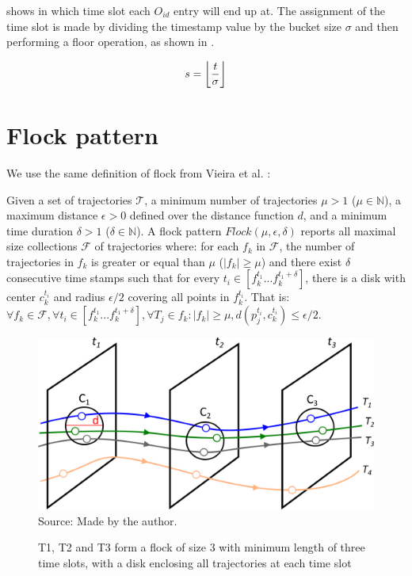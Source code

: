  shows in which time slot each $O_{id}$ entry will end up at. The assignment of the time slot is
made by dividing the timestamp value by the bucket size $\sigma$ and then performing a floor operation, as shown in
.

\begin{equation}
    \label{eq:timeslot}
    s = \floor*{\frac{t}{\sigma}}
\end{equation}

\section{Flock pattern}
\label{sec:tech_flock}
We use the same definition of flock from Vieira et al. \citep{vieira}:

\begin{Def}
\label{def:flock}
Given a set of trajectories $\mathcal{T}$, a minimum number of trajectories $\mu > 1$ ($\mu \in \mathbb{N}$), a maximum
distance $\epsilon > 0$ defined over the distance function $d$, and a minimum time duration $\delta > 1$ ($\delta \in
\mathbb{N}$). A flock pattern $Flock (\mu, \epsilon, \delta)$ reports all maximal size collections $\mathcal{F}$ of
trajectories where: for each $f_k$ in $\mathcal{F}$, the number of trajectories in $f_k$ is greater or equal than $\mu$
($|f_k| \ge \mu$) and there exist $\delta$ consecutive time stamps such that for every $t_i \in [f_k^{t_1}...f_k^{t_1 +
\delta}]$, there is a disk with center $c_k^{t_i}$ and radius $\epsilon/2$ covering all points in $f_k^{t_i}$. That is:
$\forall f_k \in \mathcal{F}, \forall t_i \in [f_k^{t_1}...f_k^{t_1 + \delta}], \forall T_j \in f_k: |f_k | \ge \mu,
d(p_j^{t_i},c_k^{t_i}) \le \epsilon/2$.
\end{Def}

\begin{figure}[h!]
    \centering
    \caption{T1, T2 and T3 form a flock of size 3 with minimum length of three time slots, with a disk enclosing all
        trajectories at each time slot}
    \includegraphics[width=\textwidth]{images/flock_2.png}
    \footnotesize{Source: Made by the author.}
    \label{fig:flock2}
\end{figure}

